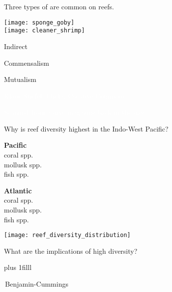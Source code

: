 \documentclass[t,handout]{beamer}  %
\begin{document}
\begin{frame}[t]{Three types of  are common on reefs.}

\begin{multicols}{2}

	\begin{center}
	
	\texttt{[image: sponge\_goby]}\\[1ex]
	
	\texttt{[image: cleaner\_shrimp]}
	
	\end{center}
	
\columnbreak

	\hangpara Indirect
	
	\hangpara Commensalism
	
	\hangpara Mutualism
		
\end{multicols}

\end{frame}

{
\begin{frame}[b]

\tiny\textcolor{white}{Klaus Stiefel, Flickr, Creative Commons.}
\end{frame}
}

{
\begin{frame}[b]

\tiny\hfill\textcolor{white}{Scanned from a dive magazine back in the day.}
\end{frame}
}

\begin{frame}[t]{Why is reef diversity highest in the Indo-West Pacific?}

\vspace*{-\baselineskip}

\begin{multicols}{2}
	\qquad\qquad\textbf{Pacific}\\
	\qquad{} coral spp.\\
	\qquad{} mollusk spp.\\
	\qquad{} fish spp.
	
\columnbreak
	
	\qquad\textbf{Atlantic}\\
	 coral spp.\\
	 mollusk spp.\\
	 fish spp.
\end{multicols}

\texttt{[image: reef\_diversity\_distribution]}

\hangpara What are the  implications of high diversity?

\vskip0pt plus 1filll

\tiny\textcopyright\,Benjamin-Cummings
\end{frame}
\end{document}
